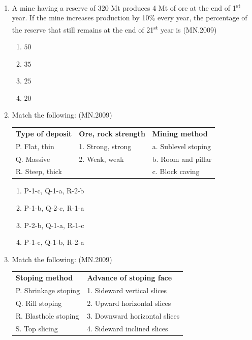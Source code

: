\documentclass[journal]{IEEEtran}
\numberwithin{equation}{enumi}
\numberwithin{figure}{enumi}
\begin{document}
\begin{enumerate}
\item A mine having a reserve of 320 Mt produces 4 Mt of ore at the end of 1\textsuperscript{st} year. If the mine increases production by 10\% every year, the percentage of the reserve that still remains at the end of 21\textsuperscript{st} year is
\hfill{(MN.2009)}
\begin{enumerate}[label=(\Alph*)]
    \item $50$
    \item $35$
    \item $25$
    \item $20$
\end{enumerate}

\item Match the following:
\hfill{(MN.2009)}
\begin{center}
\begin{tabular}{lll}
\textbf{Type of deposit} & \textbf{Ore, rock strength} & \textbf{Mining method} \\
P. Flat, thin & 1. Strong, strong & a. Sublevel stoping \\
Q. Massive & 2. Weak, weak & b. Room and pillar \\
R. Steep, thick & & c. Block caving \\
\end{tabular}
\end{center}

\begin{enumerate}[label=(\Alph*)]
\item P-1-c, Q-1-a, R-2-b
\item P-1-b, Q-2-c, R-1-a
\item P-2-b, Q-1-a, R-1-c
\item P-1-c, Q-1-b, R-2-a
\end{enumerate}

\item Match the following:
\hfill{(MN.2009)}
\begin{center}
\begin{tabular}{ll}
\textbf{Stoping method} & \textbf{Advance of stoping face} \\
P. Shrinkage stoping & 1. Sideward vertical slices \\
Q. Rill stoping & 2. Upward horizontal slices \\
R. Blasthole stoping & 3. Downward horizontal slices \\
S. Top slicing & 4. Sideward inclined slices \\
\end{tabular}
\end{center}


\end{enumerate}
\end{document}

